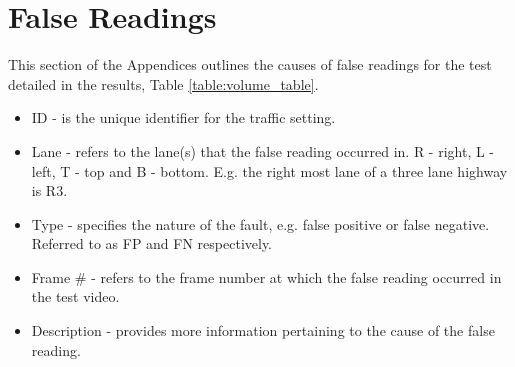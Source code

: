 \chapter{False Readings}
\label{chapter:false_readings}
This section of the Appendices outlines the causes of false readings for the test detailed in the results, Table \ref{table:volume_table}.

\begin{itemize}
    \item ID - is the unique identifier for the traffic setting.
    \item Lane - refers to the lane(s) that the false reading occurred in. R - right, L - left, T - top and B - bottom. E.g. the right most lane of a three lane highway is R3.
    \item Type - specifies the nature of the fault, e.g. false positive or false negative. Referred to as FP and FN respectively.
    \item Frame \# - refers to the frame number at which the false reading occurred in the test video.
    \item Description - provides more information pertaining to the cause of the false reading.
\end{itemize}



